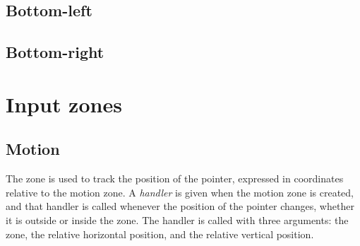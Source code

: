 

\subsection{Bottom-left}



\subsection{Bottom-right}



\section{Input zones}
\label{sec-zones-input}

\subsection{Motion}
\label{sec-zones-input-motion}

The  zone is used to track the position of the pointer,
expressed in coordinates relative to the motion zone.  A
\emph{handler} is given when the motion zone is created, and that
handler is called whenever the position of the pointer changes,
whether it is outside or inside the zone.  The handler is called with
three arguments: the zone, the relative horizontal position, and the
relative vertical position. 


